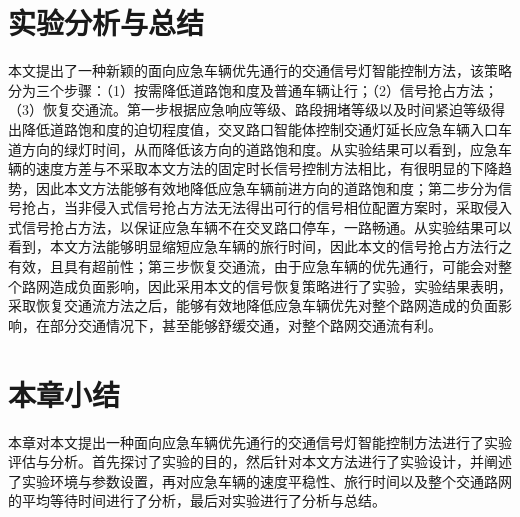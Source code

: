 \section{实验分析与总结}
本文提出了一种新颖的面向应急车辆优先通行的交通信号灯智能控制方法，该策略分为三个步骤：（1）按需降低道路饱和度及普通车辆让行；（2）信号抢占方法；（3）恢复交通流。第一步根据应急响应等级、路段拥堵等级以及时间紧迫等级得出降低道路饱和度的迫切程度值，交叉路口智能体控制交通灯延长应急车辆入口车道方向的绿灯时间，从而降低该方向的道路饱和度。从实验结果可以看到，应急车辆的速度方差与不采取本文方法的固定时长信号控制方法相比，有很明显的下降趋势，因此本文方法能够有效地降低应急车辆前进方向的道路饱和度；第二步分为信号抢占，当非侵入式信号抢占方法无法得出可行的信号相位配置方案时，采取侵入式信号抢占方法，以保证应急车辆不在交叉路口停车，一路畅通。从实验结果可以看到，本文方法能够明显缩短应急车辆的旅行时间，因此本文的信号抢占方法行之有效，且具有超前性；第三步恢复交通流，由于应急车辆的优先通行，可能会对整个路网造成负面影响，因此采用本文的信号恢复策略进行了实验，实验结果表明，采取恢复交通流方法之后，能够有效地降低应急车辆优先对整个路网造成的负面影响，在部分交通情况下，甚至能够舒缓交通，对整个路网交通流有利。
\section{本章小结}
本章对本文提出一种面向应急车辆优先通行的交通信号灯智能控制方法进行了实验评估与分析。首先探讨了实验的目的，然后针对本文方法进行了实验设计，并阐述了实验环境与参数设置，再对应急车辆的速度平稳性、旅行时间以及整个交通路网的平均等待时间进行了分析，最后对实验进行了分析与总结。
